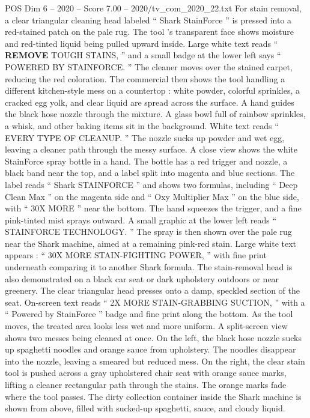 \begin{textsample}{POS Dim 6 – 2020 – Score 7.00 – 2020/tv\_com\_2020\_22.txt}
For stain removal, a clear triangular cleaning head labeled “ Shark StainForce ” is pressed into a red-stained patch on the pale rug.
The tool ’s transparent face shows moisture and red-tinted liquid being pulled upward inside.
Large white text reads “ \textbf{REMOVE} TOUGH STAINS, ” and a small badge at the lower left says “ POWERED BY STAINFORCE. ” The cleaner moves over the stained carpet, reducing the red coloration.
The commercial then shows the tool handling a different kitchen-style mess on a countertop : white powder, colorful sprinkles, a cracked egg yolk, and clear liquid are spread across the surface.
A hand guides the black hose nozzle through the mixture.
A glass bowl full of rainbow sprinkles, a whisk, and other baking items sit in the background.
White text reads “ EVERY TYPE OF CLEANUP. ” The nozzle sucks up powder and wet egg, leaving a cleaner path through the messy surface.
A close view shows the white StainForce spray bottle in a hand.
The bottle has a red trigger and nozzle, a black band near the top, and a label split into magenta and blue sections.
The label reads “ Shark STAINFORCE ” and shows two formulas, including “ Deep Clean Max ” on the magenta side and “ Oxy Multiplier Max ” on the blue side, with “ 30X MORE ” near the bottom.
The hand squeezes the trigger, and a fine pink-tinted mist sprays outward.
A small graphic at the lower left reads “ STAINFORCE TECHNOLOGY. ” The spray is then shown over the pale rug near the Shark machine, aimed at a remaining pink-red stain.
Large white text appears : “ 30X MORE STAIN-FIGHTING POWER, ” with fine print underneath comparing it to another Shark formula.
The stain-removal head is also demonstrated on a black car seat or dark upholstery outdoors or near greenery.
The clear triangular head presses onto a damp, speckled section of the seat.
On-screen text reads “ 2X MORE STAIN-GRABBING SUCTION, ” with a “ Powered by StainForce ” badge and fine print along the bottom.
As the tool moves, the treated area looks less wet and more uniform.
A split-screen view shows two messes being cleaned at once.
On the left, the black hose nozzle sucks up spaghetti noodles and orange sauce from upholstery.
The noodles disappear into the nozzle, leaving a smeared but reduced mess.
On the right, the clear stain tool is pushed across a gray upholstered chair seat with orange sauce marks, lifting a cleaner rectangular path through the stains.
The orange marks fade where the tool passes.
The dirty collection container inside the Shark machine is shown from above, filled with sucked-up spaghetti, sauce, and cloudy liquid.

\end{textsample}

